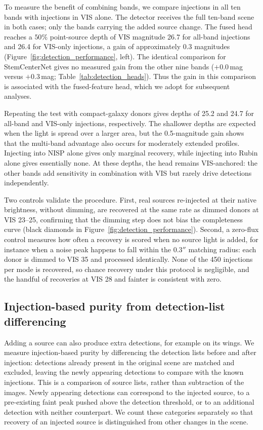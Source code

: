 \documentclass[twocolumn,linenumbers]{aastex701}
\begin{document}
To measure the benefit of combining bands, we compare injections in all ten bands with injections in VIS alone. The detector receives the full ten-band scene in both cases; only the bands carrying the added source change. The fused head reaches a $50\%$ point-source depth of VIS magnitude 26.7 for all-band injections and 26.4 for VIS-only injections, a gain of approximately 0.3 magnitudes (Figure~\ref{fig:detection_performance}, left). The identical comparison for StemCenterNet gives no measured gain from the other nine bands ($+0.0$\,mag versus $+0.3$\,mag; Table~\ref{tab:detection_heads}). Thus the gain in this comparison is associated with the fused-feature head, which we adopt for subsequent analyses.

Repeating the test with compact-galaxy donors gives depths of 25.2 and 24.7 for all-band and VIS-only injections, respectively. The shallower depths are expected when the light is spread over a larger area, but the 0.5-magnitude gain shows that the multi-band advantage also occurs for moderately extended profiles. Injecting into NISP alone gives only marginal recovery, while injecting into Rubin alone gives essentially none. At these depths, the head remains VIS-anchored: the other bands add sensitivity in combination with VIS but rarely drive detections independently.

Two controls validate the procedure. First, real sources re-injected at their native brightness, without dimming, are recovered at the same rate as dimmed donors at VIS 23--25, confirming that the dimming step does not bias the completeness curve (black diamonds in Figure~\ref{fig:detection_performance}). Second, a zero-flux control measures how often a recovery is scored when no source light is added, for instance when a noise peak happens to fall within the $0.3''$ matching radius: each donor is dimmed to VIS 35 and processed identically. None of the 450 injections per mode is recovered, so chance recovery under this protocol is negligible, and the handful of recoveries at VIS 28 and fainter is consistent with zero.

\subsection{Injection-based purity from detection-list differencing}

Adding a source can also produce extra detections, for example on its wings. We measure injection-based purity by differencing the detection lists before and after injection: detections already present in the original scene are matched and excluded, leaving the newly appearing detections to compare with the known injections. This is a comparison of source lists, rather than subtraction of the images. Newly appearing detections can correspond to the injected source, to a pre-existing faint peak pushed above the detection threshold, or to an additional detection with neither counterpart. We count these categories separately so that recovery of an injected source is distinguished from other changes in the scene.
\end{document}
